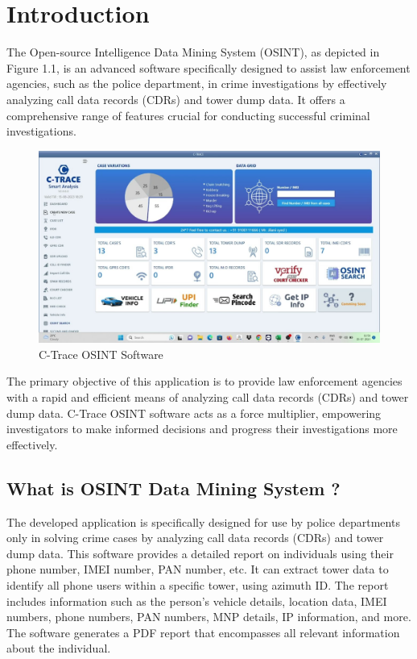 \chapter{Introduction}
\justify

The Open-source Intelligence Data Mining System (OSINT), as depicted in Figure 1.1, is an advanced software specifically designed to assist law enforcement agencies, such as the police department, in crime investigations by effectively analyzing call data records (CDRs) and tower dump data. It offers a comprehensive range of features crucial for conducting successful criminal investigations.

\begin{figure}
    \centering
    \includegraphics[width=1\linewidth]{Media/maxresdefault.jpg}
    \caption{C-Trace OSINT Software}
    \label{fig:CTraceOSINTSoftware}
\end{figure}

The primary objective of this application is to provide law enforcement agencies with a rapid and efficient means of analyzing call data records (CDRs) and tower dump data. C-Trace OSINT software acts as a force multiplier, empowering investigators to make informed decisions and progress their investigations more effectively.

\section{What is OSINT Data Mining System ?}

The developed application is specifically designed for use by police departments only in solving crime cases by analyzing call data records (CDRs) and tower dump data. This software provides a detailed report on individuals using their phone number, IMEI number, PAN number, etc. It can extract tower data to identify all phone users within a specific tower, using azimuth ID. The report includes information such as the person's vehicle details, location data, IMEI numbers, phone numbers, PAN numbers, MNP details, IP information, and more. The software generates a PDF report that encompasses all relevant information about the individual.

